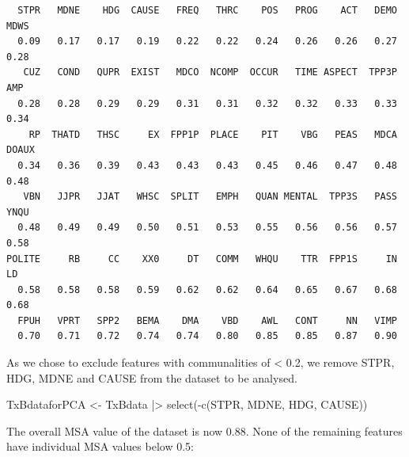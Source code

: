 \documentclass[
  letterpaper,
  DIV=11,
  numbers=noendperiod]{scrreprt}
\newenvironment{Shaded}{\begin{snugshade}}{\end{snugshade}}
\newcommand{\DecValTok}[1]{\textcolor[rgb]{0.68,0.00,0.00}{#1}}
\newcommand{\FunctionTok}[1]{\textcolor[rgb]{0.28,0.35,0.67}{#1}}
\newcommand{\NormalTok}[1]{\textcolor[rgb]{0.00,0.23,0.31}{#1}}
\newcommand{\OtherTok}[1]{\textcolor[rgb]{0.00,0.23,0.31}{#1}}
\newcommand{\SpecialCharTok}[1]{\textcolor[rgb]{0.37,0.37,0.37}{#1}}
\begin{document}
\begin{verbatim}
  STPR   MDNE    HDG  CAUSE   FREQ   THRC    POS   PROG    ACT   DEMO   MDWS 
  0.09   0.17   0.17   0.19   0.22   0.22   0.24   0.26   0.26   0.27   0.28 
   CUZ   COND   QUPR  EXIST   MDCO  NCOMP  OCCUR   TIME ASPECT  TPP3P    AMP 
  0.28   0.28   0.29   0.29   0.31   0.31   0.32   0.32   0.33   0.33   0.34 
    RP  THATD   THSC     EX  FPP1P  PLACE    PIT    VBG   PEAS   MDCA  DOAUX 
  0.34   0.36   0.39   0.43   0.43   0.43   0.45   0.46   0.47   0.48   0.48 
   VBN   JJPR   JJAT   WHSC  SPLIT   EMPH   QUAN MENTAL  TPP3S   PASS   YNQU 
  0.48   0.49   0.49   0.50   0.51   0.53   0.55   0.56   0.56   0.57   0.58 
POLITE     RB     CC    XX0     DT   COMM   WHQU    TTR  FPP1S     IN     LD 
  0.58   0.58   0.58   0.59   0.62   0.62   0.64   0.65   0.67   0.68   0.68 
  FPUH   VPRT   SPP2   BEMA    DMA    VBD    AWL   CONT     NN   VIMP 
  0.70   0.71   0.72   0.74   0.74   0.80   0.85   0.85   0.87   0.90 
\end{verbatim}

As we chose to exclude features with communalities of \textless{} 0.2,
we remove STPR, HDG, MDNE and CAUSE from the dataset to be analysed.

\begin{Shaded}
\begin{Highlighting}[]
\NormalTok{TxBdataforPCA }\OtherTok{\textless{}{-}}\NormalTok{ TxBdata }\SpecialCharTok{|\textgreater{}} 
  \FunctionTok{select}\NormalTok{(}\SpecialCharTok{{-}}\FunctionTok{c}\NormalTok{(STPR, MDNE, HDG, CAUSE))}
\end{Highlighting}
\end{Shaded}

The overall MSA value of the dataset is now 0.88. None of the remaining
features have individual MSA values below 0.5:

\begin{Shaded}
\end{Shaded}
\end{document}
